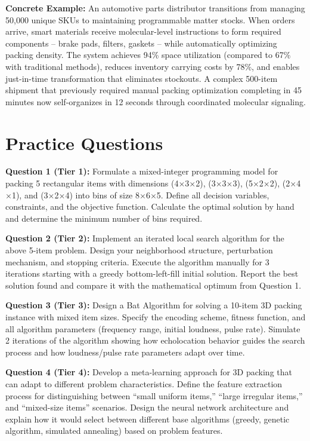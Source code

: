 \documentclass{article}
\begin{document}
\textbf{Concrete Example:} An automotive parts distributor transitions from managing 50,000 unique SKUs to maintaining programmable matter stocks. When orders arrive, smart materials receive molecular-level instructions to form required components -- brake pads, filters, gaskets -- while automatically optimizing packing density. The system achieves 94\% space utilization (compared to 67\% with traditional methods), reduces inventory carrying costs by 78\%, and enables just-in-time transformation that eliminates stockouts. A complex 500-item shipment that previously required manual packing optimization completing in 45 minutes now self-organizes in 12 seconds through coordinated molecular signaling.

\section{Practice Questions}

\textbf{Question 1 (Tier 1):} Formulate a mixed-integer programming model for packing 5 rectangular items with dimensions (4$\times$3$\times$2), (3$\times$3$\times$3), (5$\times$2$\times$2), (2$\times$4$\times$1), and (3$\times$2$\times$4) into bins of size 8$\times$6$\times$5. Define all decision variables, constraints, and the objective function. Calculate the optimal solution by hand and determine the minimum number of bins required.

\textbf{Question 2 (Tier 2):} Implement an iterated local search algorithm for the above 5-item problem. Design your neighborhood structure, perturbation mechanism, and stopping criteria. Execute the algorithm manually for 3 iterations starting with a greedy bottom-left-fill initial solution. Report the best solution found and compare it with the mathematical optimum from Question 1.

\textbf{Question 3 (Tier 3):} Design a Bat Algorithm for solving a 10-item 3D packing instance with mixed item sizes. Specify the encoding scheme, fitness function, and all algorithm parameters (frequency range, initial loudness, pulse rate). Simulate 2 iterations of the algorithm showing how echolocation behavior guides the search process and how loudness/pulse rate parameters adapt over time.

\textbf{Question 4 (Tier 4):} Develop a meta-learning approach for 3D packing that can adapt to different problem characteristics. Define the feature extraction process for distinguishing between ``small uniform items,'' ``large irregular items,'' and ``mixed-size items'' scenarios. Design the neural network architecture and explain how it would select between different base algorithms (greedy, genetic algorithm, simulated annealing) based on problem features.
\end{document}

